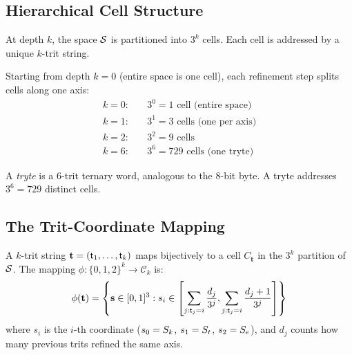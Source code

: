 \subsection{Hierarchical Cell Structure}

\begin{definition}
\label{def:cell}
At depth $k$, the space $\mathcal{S}$ is partitioned into $3^k$ cells. Each cell is addressed by a unique $k$-trit string.
\end{definition}

Starting from depth $k=0$ (entire space is one cell), each refinement step splits cells along one axis:
\begin{align}
k = 0: \quad & 3^0 = 1 \text{ cell (entire space)} \\
k = 1: \quad & 3^1 = 3 \text{ cells (one per axis)} \\
k = 2: \quad & 3^2 = 9 \text{ cells} \\
k = 6: \quad & 3^6 = 729 \text{ cells (one tryte)}
\end{align}

\begin{definition}[Tryte]
\label{def:tryte}
A \textit{tryte} is a 6-trit ternary word, analogous to the 8-bit byte. A tryte addresses $3^6 = 729$ distinct cells.
\end{definition}

\subsection{The Trit-Coordinate Mapping}

\begin{theorem}
\label{thm:trit_coord}
A $k$-trit string $\mathbf{t} = (\mathsf{t}_1, \ldots, \mathsf{t}_k)$ maps bijectively to a cell $C_{\mathbf{t}}$ in the $3^k$ partition of $\mathcal{S}$. The mapping $\phi: \{0,1,2\}^k \to \mathcal{C}_k$ is:
\begin{equation}
\phi(\mathbf{t}) = \left\{ \mathbf{s} \in [0,1]^3 : s_i \in \left[\sum_{j:\mathsf{t}_j=i} \frac{d_j}{3^j}, \sum_{j:\mathsf{t}_j=i} \frac{d_j + 1}{3^j}\right] \right\}
\end{equation}
where $s_i$ is the $i$-th coordinate ($s_0 = S_k$, $s_1 = S_t$, $s_2 = S_e$), and $d_j$ counts how many previous trits refined the same axis.
\end{theorem}

